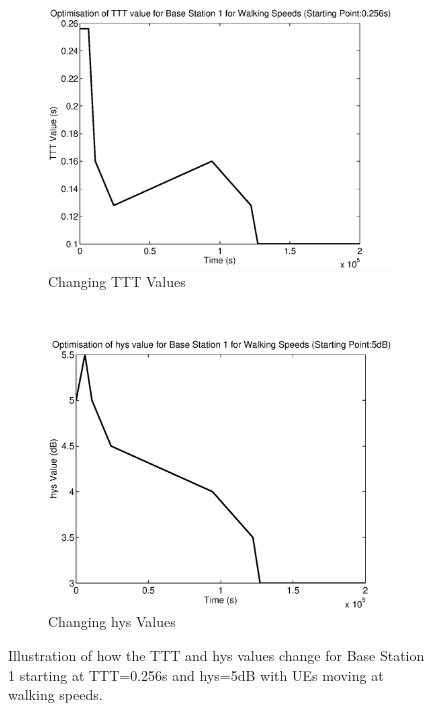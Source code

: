 \begin{figure}[H]
        \centering
        \begin{subfigure}[b]{0.49\textwidth}
                \includegraphics[width=\textwidth]{figures/graphs/walkmid/TTT1.eps}
                \caption{Changing TTT Values}
        \end{subfigure}%
        ~ %
        \begin{subfigure}[b]{0.49\textwidth}
                \includegraphics[width=\textwidth]{figures/graphs/walkmid/hys1.eps}
                \caption{Changing hys Values}
        \end{subfigure}
        \caption{Illustration of how the TTT and hys values change for Base Station 1 starting at TTT=0.256s and hys=5dB with UEs moving at walking speeds.}
\end{figure}
